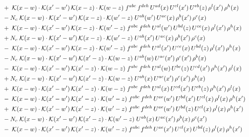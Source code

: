 \documentclass[9pt]{article}
\begin{document}
\begin{align}
&\quad +\;\mathcal{K}(x-w)\cdot\mathcal{K}(x'-w')\,\mathcal{K}(x-z)\cdot\mathcal{K}(w-z)\;f^{abc}\,f^{deh}\,U^{ad}(x)\,U^{cl}(x')\,U^{eb}(z)\,\rho^{l}(x')\,\rho^{h}(x)\notag\\
&\quad -N_c\;\mathcal{K}(x-w)\cdot\mathcal{K}(x'-w')\,\mathcal{K}(x-z)\cdot\mathcal{K}(w'-z)\;U^{ab}(w')\,U^{ac}(x)\,\rho^{b}(x')\,\rho^{c}(x)\notag\\
&\quad +\;\mathcal{K}(x-w)\cdot\mathcal{K}(x'-w')\,\mathcal{K}(x-z)\cdot\mathcal{K}(w'-z)\;f^{abc}\,f^{deh}\,U^{al}(w')\,U^{bd}(z)\,U^{ce}(x)\,\rho^{l}(x')\,\rho^{h}(x)\notag\\
&\quad +N_c\;\mathcal{K}(x-w)\cdot\mathcal{K}(x'-w')\,\mathcal{K}(x-z)\cdot\mathcal{K}(w'-z)\;U^{ab}(x')\,U^{ac}(x)\,\rho^{b}(x')\,\rho^{c}(x)\notag\\
&\quad -\;\mathcal{K}(x-w)\cdot\mathcal{K}(x'-w')\,\mathcal{K}(x-z)\cdot\mathcal{K}(w'-z)\;f^{abc}\,f^{deh}\,U^{al}(x')\,U^{ce}(x)\,U^{bd}(z)\,\rho^{l}(x')\,\rho^{h}(x)\notag\\
&\quad -N_c\;\mathcal{K}(x-w)\cdot\mathcal{K}(x'-w')\,\mathcal{K}(x'-z)\cdot\mathcal{K}(w-z)\;U^{ab}(w)\,U^{ac}(x')\,\rho^{c}(x')\,\rho^{b}(x)\notag\\
&\quad -\;\mathcal{K}(x-w)\cdot\mathcal{K}(x'-w')\,\mathcal{K}(x'-z)\cdot\mathcal{K}(w-z)\;f^{abc}\,f^{deh}\,U^{al}(w)\,U^{be}(z)\,U^{cd}(x')\,\rho^{h}(x')\,\rho^{l}(x)\notag\\
&\quad +N_c\;\mathcal{K}(x-w)\cdot\mathcal{K}(x'-w')\,\mathcal{K}(x'-z)\cdot\mathcal{K}(w-z)\;U^{ab}(x)\,U^{ac}(x')\,\rho^{c}(x')\,\rho^{b}(x)\notag\\
&\quad +\;\mathcal{K}(x-w)\cdot\mathcal{K}(x'-w')\,\mathcal{K}(x'-z)\cdot\mathcal{K}(w-z)\;f^{abc}\,f^{deh}\,U^{al}(x)\,U^{cd}(x')\,U^{eb}(z)\,\rho^{h}(x')\,\rho^{l}(x)\notag\\
&\quad -\;\mathcal{K}(x-w)\cdot\mathcal{K}(x'-w')\,\mathcal{K}(x'-z)\cdot\mathcal{K}(w'-z)\;f^{abc}\,f^{deh}\,U^{ae}(w')\,U^{bd}(x')\,U^{cl}(x)\,\rho^{l}(x)\,\rho^{h}(x')\notag\\
&\quad +\;\mathcal{K}(x-w)\cdot\mathcal{K}(x'-w')\,\mathcal{K}(x'-z)\cdot\mathcal{K}(w'-z)\;f^{abc}\,f^{deh}\,U^{ae}(w')\,U^{bd}(z)\,U^{cl}(x)\,\rho^{l}(x)\,\rho^{h}(x')\notag\\
&\quad -N_c\;\mathcal{K}(x-w)\cdot\mathcal{K}(x'-w')\,\mathcal{K}(x'-z)\cdot\mathcal{K}(w'-z)\;U^{ab}(x)\,U^{ac}(x')\,\rho^{b}(x)\,\rho^{c}(x')\notag\\
&\quad -\;\mathcal{K}(x-w)\cdot\mathcal{K}(x'-w')\,\mathcal{K}(x'-z)\cdot\mathcal{K}(w'-z)\;f^{abc}\,f^{deh}\,U^{ae}(x')\,U^{cl}(x)\,U^{bd}(z)\,\rho^{l}(x)\,\rho^{h}(x')\notag\\

\end{align}
\end{document}

